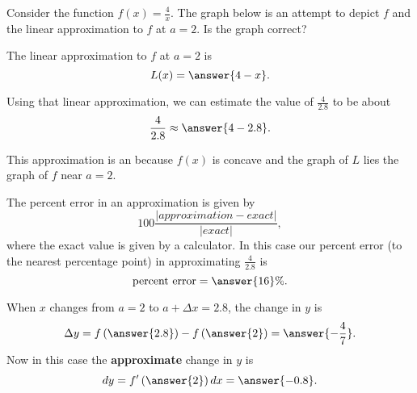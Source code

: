 \documentclass{ximera}
\author{Nela Lakos \and Kyle Parsons}
\begin{document}
\begin{exercise}

Consider the function $f(x) = \frac{4}{x}$.  The graph below is an attempt to depict $f$ and the linear approximation to $f$ at $a=2$. Is the graph correct?
\begin{multipleChoice}
\end{multipleChoice}

\begin{image}
\end{image}

The linear approximation to $f$ at $a=2$ is
\[
L(x) = \answer{4-x}.
\]

Using that linear approximation, we can estimate the value of $\frac{4}{2.8}$ to be about
\[
\frac{4}{2.8} \approx \answer{4-2.8}.
\]

This approximation is an  because $f(x)$ is concave  and the graph of $L$ lies  the graph of $f$ near $a=2$.

The percent error in an approximation is given by
\[
100\frac{|approximation - exact|}{|exact|},
\]
where the exact value is given by a calculator.  In this case our percent error (to the nearest percentage point) in approximating $\frac{4}{2.8}$ is
\[
\textnormal{percent error} = \answer{16}\%.
\]

When $x$ changes from $a=2$ to $a+\Delta x = 2.8$, the change in $y$ is 
\[
\Delta y = f\left(\answer{2.8}\right) - f\left(\answer{2}\right) = \answer{-\frac{4}{7}}.
\]
Now in this case the \textbf{approximate} change in $y$ is
\[
\d{y} = f'\left(\answer{2}\right)\d{x} = \answer{-0.8}.
\]


\end{exercise}
\end{document}
